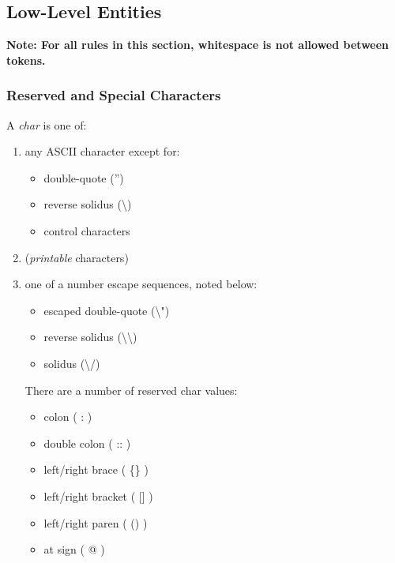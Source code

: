 \documentclass{article}
\begin{document}
        \subsection{Low-Level Entities}
                \bf Note: \rm For all rules in this section,
                whitespace is not allowed between tokens.
                \subsubsection{Reserved and Special Characters}
                        A \emph{char} is one of:
                        \begin{enumerate}
                                \item any ASCII character except for:
                                \begin{itemize}
                                        \item double-quote ('') 
                                        \item reverse solidus (\textbackslash)
                                        \item control characters
                                \end{itemize}
                                \item (\emph{printable} characters)
                                \item one of a number escape sequences, noted below:
                                \begin{itemize}
                                        \item escaped double-quote (\textbackslash")
                                        \item reverse solidus (\textbackslash\textbackslash)
                                        \item solidus (\textbackslash/)
                                \end{itemize}
                                There are a number of reserved char values:
                                \begin{itemize}
                                        \item colon ( : )
                                        \item double colon ( :: )
                                        \item left/right brace ( \{\} )
                                        \item left/right bracket ( [] )
                                        \item left/right paren ( () )
                                        \item at sign ( @ )
                                \end{itemize}           
                        \end{enumerate}
                        
\end{document}
